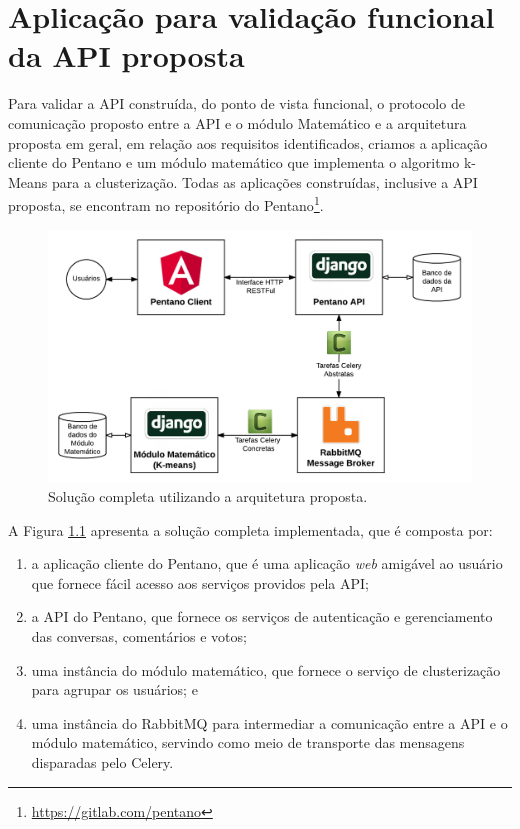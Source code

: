 \chapter{Aplicação para validação funcional da API proposta} \label{cap:aplicacao_exemplo}

  Para validar a API construída, do ponto de vista funcional, o protocolo de comunicação proposto entre a API e o módulo Matemático
  e a arquitetura proposta em geral, em relação aos requisitos identificados,
  criamos a aplicação cliente do Pentano e um módulo matemático que implementa o algoritmo k-Means para a clusterização.
  Todas as aplicações construídas, inclusive a API proposta, se encontram no repositório do Pentano\footnote{\href{https://gitlab.com/pentano}{https://gitlab.com/pentano}}.
  
  \begin{figure}[h!]
    \centering
    \includegraphics[scale=0.4]{figuras/whole_solution.png}
    \caption{Solução completa utilizando a arquitetura proposta.}
    \label{fig:whole_solution}
  \end{figure}
  
  A Figura \ref{fig:whole_solution} apresenta a solução completa implementada, que
  é composta por:
  
  \begin{enumerate}
      \item a aplicação cliente do Pentano, que é uma aplicação \textit{web} amigável ao usuário que fornece 
      fácil acesso aos serviços providos pela API;
      \item a API do Pentano, que fornece os serviços de autenticação e gerenciamento das conversas, comentários e votos; 
      \item uma instância do módulo matemático,
	  que fornece o serviço de clusterização para agrupar os usuários; e
      \item uma instância do RabbitMQ para
	  intermediar a comunicação entre a API e o módulo matemático, servindo como meio de transporte das
	  mensagens disparadas pelo Celery.
	  
  \end{enumerate}

